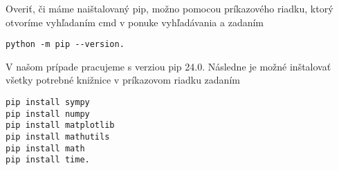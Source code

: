 \noindent Overiť, či máme naištalovaný pip, možno pomocou príkazového riadku, ktorý otvoríme vyhľadaním cmd v ponuke vyhľadávania a zadaním
\begin{verbatim}
python -m pip --version.
\end{verbatim}
V našom prípade pracujeme s verziou pip 24.0. Následne je možné inštalovať všetky potrebné knižnice v príkazovom riadku zadaním
\begin{verbatim}
pip install sympy
pip install numpy
pip install matplotlib
pip install mathutils
pip install math
pip install time.
\end{verbatim}